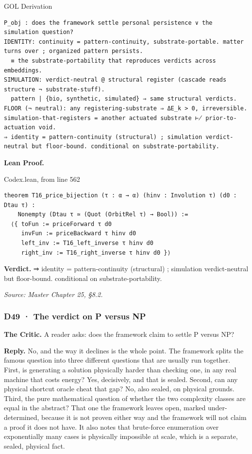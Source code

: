\documentclass[10pt,twocolumn]{article}
\begin{document}
\begin{golbox}{GOL Derivation}
\begin{lstlisting}[style=golv]
P_obj : does the framework settle personal persistence ∨ the simulation question?
IDENTITY: continuity = pattern-continuity, substrate-portable. matter turns over ; organized pattern persists.
  ≡ the substrate-portability that reproduces verdicts across embeddings.
SIMULATION: verdict-neutral @ structural register (cascade reads structure ¬ substrate-stuff).
  pattern | {bio, synthetic, simulated} ⇒ same structural verdicts.
FLOOR (¬ neutral): any registering-substrate ⇒ ΔE_k > 0, irreversible. simulation-that-registers = another actuated substrate ⊬ prior-to-actuation void.
⇒ identity = pattern-continuity (structural) ; simulation verdict-neutral but floor-bound. conditional on substrate-portability.
\end{lstlisting}
\end{golbox}

\textbf{Lean Proof.}

\begin{leanexcerpt}{Codex.lean, from line 562}
\begin{lstlisting}[style=leanx,firstnumber=562]
theorem T16_price_bijection (τ : α → α) (hinv : Involution τ) (d0 : Dtau τ) :
    Nonempty (Dtau τ ≃ (Quot (OrbitRel τ) → Bool)) :=
  ⟨{ toFun := priceForward τ d0
     invFun := priceBackward τ hinv d0
     left_inv := T16_left_inverse τ hinv d0
     right_inv := T16_right_inverse τ hinv d0 }⟩
\end{lstlisting}
\end{leanexcerpt}

\textbf{Verdict.} ⇒ identity = pattern-continuity (structural) ;
simulation verdict-neutral but floor-bound. conditional on
substrate-portability.

\emph{Source: Master Chapter 25, §8.2.}

\hypertarget{d49-the-verdict-on-p-versus-np}{%
\subsubsection{D49 · The verdict on P versus
NP}\label{d49-the-verdict-on-p-versus-np}}

\textbf{The Critic.} A reader asks: does the framework claim to settle P
versus NP?

\textbf{Reply.} No, and the way it declines is the whole point. The
framework splits the famous question into three different questions that
are usually run together. First, is generating a solution physically
harder than checking one, in any real machine that costs energy? Yes,
decisively, and that is sealed. Second, can any physical shortcut oracle
cheat that gap? No, also sealed, on physical grounds. Third, the pure
mathematical question of whether the two complexity classes are equal in
the abstract? That one the framework leaves open, marked
under-determined, because it is not proven either way and the framework
will not claim a proof it does not have. It also notes that brute-force
enumeration over exponentially many cases is physically impossible at
scale, which is a separate, sealed, physical fact.
\end{document}
